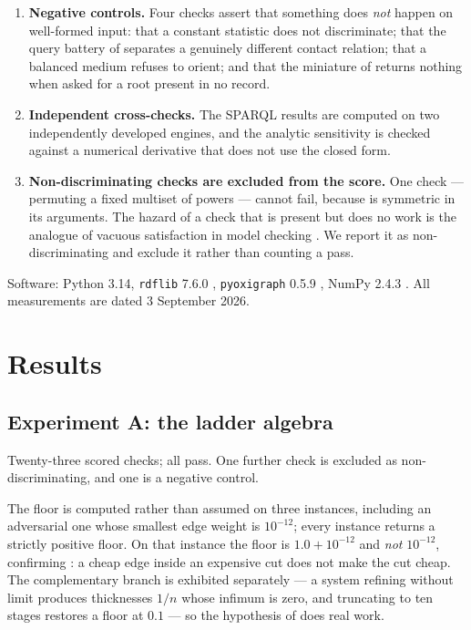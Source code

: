 \documentclass[11pt,twocolumn,a4paper]{article}
\theoremstyle{thmstyle}
\theoremstyle{definition}
\theoremstyle{remark}
\begin{document}
\begin{enumerate}[leftmargin=1.6em,itemsep=2pt]
\item \textbf{Negative controls.} Four checks assert that something does
      \emph{not} happen on well-formed input: that a constant statistic does
      not discriminate; that the query battery of  separates a
      genuinely different contact relation; that a balanced medium refuses to
      orient; and that the miniature of  returns nothing when
      asked for a root present in no record.
\item \textbf{Independent cross-checks.} The SPARQL results are computed on
      two independently developed engines, and the analytic sensitivity is
      checked against a numerical derivative that does not use the closed
      form.
\item \textbf{Non-discriminating checks are excluded from the score.} One
      check --- permuting a fixed multiset of powers --- cannot fail, because
       is symmetric in its arguments. The hazard of a check
      that is present but does no work is the analogue of vacuous
      satisfaction in model checking \citep{beer2001,kupferman2003}. We report it as
      non-discriminating and exclude it rather than counting a pass.
\end{enumerate}

Software: Python 3.14, \texttt{rdflib} 7.6.0 \citep{rdflib},
\texttt{pyoxigraph} 0.5.9 \citep{pyoxigraph}, NumPy 2.4.3
\citep{harris2020numpy}. All measurements are dated 3 September 2026.

\section{Results}
\label{sec:results}

\subsection{Experiment A: the ladder algebra}
\label{sec:res-a}

Twenty-three scored checks; all pass. One further check is excluded as
non-discriminating, and one is a negative control.

The floor is computed rather than assumed on three instances, including an
adversarial one whose smallest edge weight is $10^{-12}$; every instance
returns a strictly positive floor. On that instance the floor is
$1.0+10^{-12}$ and \emph{not} $10^{-12}$, confirming : a
cheap edge inside an expensive cut does not make the cut cheap. The
complementary branch is exhibited separately --- a system refining without
limit produces thicknesses $1/n$ whose infimum is zero, and truncating to ten
stages restores a floor at $0.1$ --- so the hypothesis of 
does real work.
\end{document}

